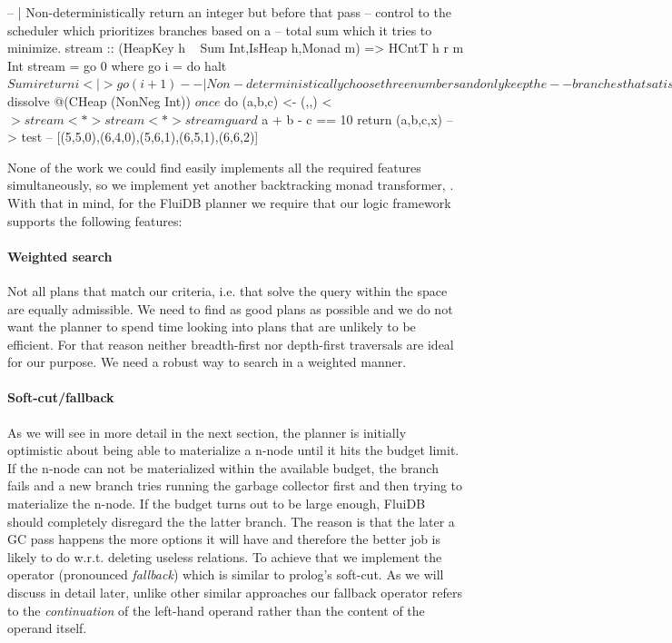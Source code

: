 \begin{code}
\begin{haskellcode}
  -- | Non-deterministically return an integer but before that pass
  -- control to the scheduler which prioritizes branches based on a
  -- total sum which it tries to minimize.
  stream :: (HeapKey h ~ Sum Int,IsHeap h,Monad m) => HCntT h r m Int
  stream = go 0 where
    go i = do
      halt $ Sum i
      return i <|> go (i+1)

  -- | Non-deterministically choose three numbers and only keep the
  -- branches that satisfy a + b - c == 10. Avoid diverging by prefering
  -- branches for which the sum of the numbers is minimum.
  test2 :: IO [(Int,Int,Int)]
  test2 = takeListT 5 $ dissolve @(CHeap (NonNeg Int)) $ once $ do
    (a,b,c) <- (,,) <$> stream <*> stream <*> stream
    guard $ a + b - c == 10
    return (a,b,c,x)
  -- > test
  -- [(5,5,0),(6,4,0),(5,6,1),(6,5,1),(6,6,2)]
\end{haskellcode}
  \caption{\label{lst:halt_example}Prioritise branches that we want to
    be executed first.}
\end{code}

None of the work we could find easily implements all the required
features simultaneously, so we implement yet another backtracking monad
transformer, . With that in mind, for the FluiDB planner
we require that our logic framework supports the following features:

\paragraph{Weighted search}
Not all plans that match our criteria, i.e. that
solve the query within the space are equally admissible. We need to
find as good plans as possible and we do not want the planner to spend
time looking into plans that are unlikely to be efficient. For that
reason neither breadth-first nor depth-first traversals are ideal for
our purpose. We need a robust way to search in a weighted manner.

\paragraph{Soft-cut/fallback}
As we will see in more detail in the next section, the planner is
initially optimistic about being able to materialize a n-node until it
hits the budget limit. If the n-node can not be materialized within the
available budget, the branch fails and a new branch tries running the
garbage collector first and then trying to materialize the n-node.  If
the budget turns out to be large enough, FluiDB should completely
disregard the the latter branch.  The reason is that the later a GC
pass happens the more options it will have and therefore the better
job is likely to do w.r.t. deleting useless relations.  To achieve
that we implement the operator \hask{<//>} (pronounced
\emph{fallback}) which is similar to prolog's soft-cut. As we will
discuss in detail later, unlike other similar approaches our fallback
operator refers to the \emph{continuation} of the left-hand operand
rather than the content of the operand itself.

